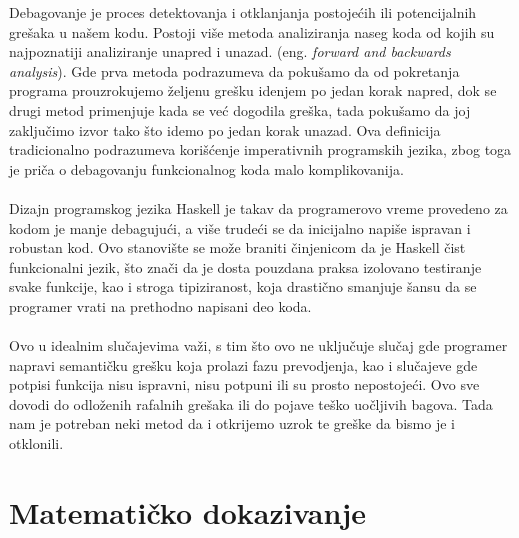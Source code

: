 \documentclass[a4paper]{article}
\begin{document}
{{
Debagovanje je proces detektovanja i otklanjanja postojećih ili potencijalnih grešaka u našem kodu. Postoji više metoda analiziranja naseg koda od kojih su najpoznatiji analiziranje unapred i unazad. (eng. {\em forward and backwards analysis})\cite{geeks_for_geeks}. Gde prva metoda podrazumeva da pokušamo da od pokretanja programa prouzrokujemo željenu grešku idenjem po jedan korak napred, dok se drugi metod primenjuje kada se već dogodila greška, tada pokušamo da joj zaključimo izvor tako što idemo po jedan korak unazad. Ova definicija tradicionalno podrazumeva korišćenje imperativnih programskih jezika, zbog toga je priča o debagovanju funkcionalnog koda malo komplikovanija. 
\\ \\
Dizajn programskog jezika Haskell je takav da programerovo vreme provedeno za kodom je manje debagujući, a više trudeći se da inicijalno napiše ispravan i robustan kod. Ovo stanovište se može braniti činjenicom da je Haskell čist funkcionalni jezik, što znači da je dosta pouzdana praksa izolovano testiranje svake funkcije, kao i stroga tipiziranost, koja drastično smanjuje šansu da se programer vrati na prethodno napisani deo koda. 
\\ \\
Ovo u idealnim slučajevima važi, s tim što ovo ne uključuje slučaj gde programer napravi semantičku grešku koja prolazi fazu prevodjenja, kao i slučajeve gde potpisi funkcija nisu ispravni, nisu potpuni ili su prosto nepostojeći. Ovo sve dovodi do odloženih rafalnih grešaka ili do pojave teško uočljivih bagova. Tada nam je potreban neki metod da i otkrijemo uzrok te greške da bismo je i otklonili.}

\section{Matematičko dokazivanje}

}
\end{document}
